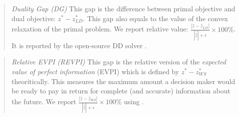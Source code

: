 %

\begin{quote}
\noindent\textit{Duality Gap (DG)} This gap is the difference between primal objective and dual objective: $z^*-z^*_{LD}$. This gap also equals to the value of the convex relaxation of the primal problem. We report relative value: $\frac{|\hat{z}-\hat{z}_{LD}|}{|\hat{\hat{z}}|+\epsilon}\times 100\%$. It is reported by the open-source DD solver \dsp. 
\end{quote}

\begin{quote}
\noindent\textit{Relative EVPI (REVPI)} This gap is the relative version of the \textit{expected value of perfect information} (EVPI) which is defined by $z^*-z^*_{WS}$ theoritically. This measures the maximum amount a decision maker would be ready to pay in return for complete (and accurate) information about the future. We report $\frac{|\hat{z}-\hat{z}_{WS}|}{|\hat{\hat{z}}|+\epsilon}\times 100\%$ using \cplex.
\end{quote}

